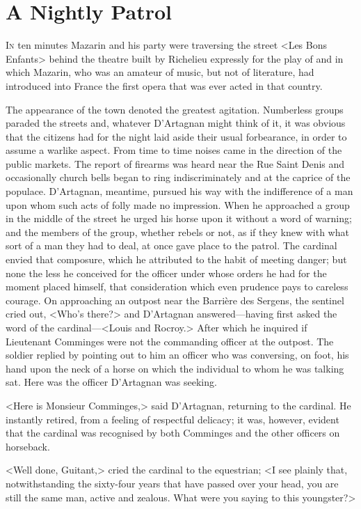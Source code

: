 \chapter{A Nightly Patrol}

 \lettrine{I}{n} ten minutes Mazarin and his party were traversing the street <Les Bons Enfants> behind the theatre built by Richelieu expressly for the play of  and in which Mazarin, who was an amateur of music, but not of literature, had introduced into France the first opera that was ever acted in that country.

The appearance of the town denoted the greatest agitation. Numberless groups paraded the streets and, whatever D'Artagnan might think of it, it was obvious that the citizens had for the night laid aside their usual forbearance, in order to assume a warlike aspect. From time to time noises came in the direction of the public markets. The report of firearms was heard near the Rue Saint Denis and occasionally church bells began to ring indiscriminately and at the caprice of the populace. D'Artagnan, meantime, pursued his way with the indifference of a man upon whom such acts of folly made no impression. When he approached a group in the middle of the street he urged his horse upon it without a word of warning; and the members of the group, whether rebels or not, as if they knew with what sort of a man they had to deal, at once gave place to the patrol. The cardinal envied that composure, which he attributed to the habit of meeting danger; but none the less he conceived for the officer under whose orders he had for the moment placed himself, that consideration which even prudence pays to careless courage. On approaching an outpost near the Barrière des Sergens, the sentinel cried out, <Who's there?> and D'Artagnan answered—having first asked the word of the cardinal—<Louis and Rocroy.> After which he inquired if Lieutenant Comminges were not the commanding officer at the outpost. The soldier replied by pointing out to him an officer who was conversing, on foot, his hand upon the neck of a horse on which the individual to whom he was talking sat. Here was the officer D'Artagnan was seeking.

<Here is Monsieur Comminges,> said D'Artagnan, returning to the cardinal. He instantly retired, from a feeling of respectful delicacy; it was, however, evident that the cardinal was recognised by both Comminges and the other officers on horseback.

<Well done, Guitant,> cried the cardinal to the equestrian; <I see plainly that, notwithstanding the sixty-four years that have passed over your head, you are still the same man, active and zealous. What were you saying to this youngster?>

